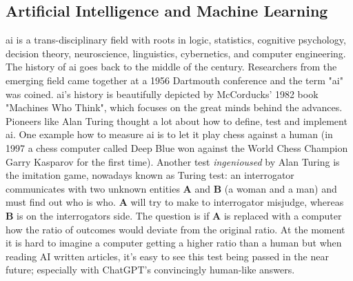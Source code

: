 \subsection{Artificial Intelligence and Machine Learning}
\Gls{ai} is a trans-disciplinary field with roots in logic, statistics, cognitive psychology, decision theory, neuroscience, linguistics, cybernetics, and computer engineering\cite{howard2019artificial}.
The history of \gls{ai} goes back to the middle of the  century. 
Researchers from the emerging field came together at a 1956 Dartmouth conference and the term "\gls{ai}" was coined\cite{McCarthy1955}. 
\Gls{ai}'s  history is beautifully depicted by McCorducks' 1982 book "Machines Who Think"\cite{McCorduck1982,Apter1982}, which focuses on the great minds behind the advances.
Pioneers like Alan Turing thought a lot about how to define, test and implement \gls{ai}\cite{howard2019artificial}. 
One example how to measure \gls{ai} is to let it play chess against a human\cite{Silver2017} 
(in 1997 a chess computer called Deep Blue won against the World Chess Champion Garry Kasparov for the first time\cite{Feng1999}).
Another test \textit{ingenioused} by Alan Turing is the imitation game\cite{turing1950imitation}, nowadays known as Turing test:
an interrogator communicates with two unknown entities \textbf{A} and \textbf{B} (a woman and a man) and must find out who is who. 
\textbf{A} will try to make to interrogator misjudge, whereas \textbf{B} is on the interrogators side.
The question is if \textbf{A} is replaced with a computer how the ratio of outcomes would deviate from the original ratio. 
%
At the moment it is hard to imagine a computer getting a higher ratio than a human
but when reading AI written articles\cite{gpt2020}, it's easy to see this test being passed in the near future; especially with ChatGPT's convincingly human-like answers\cite{dis2023chatgpt}.


